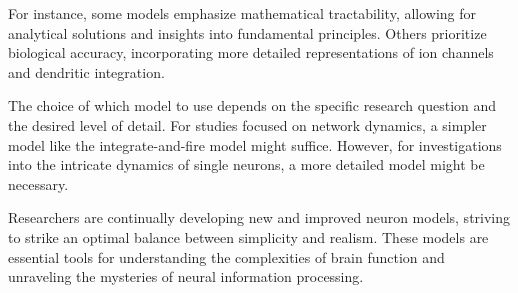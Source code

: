 For instance, some models emphasize mathematical tractability, allowing for analytical solutions and insights into fundamental principles. Others prioritize biological accuracy, incorporating more detailed representations of ion channels and dendritic integration.

The choice of which model to use depends on the specific research question and the desired level of detail. For studies focused on network dynamics, a simpler model like the integrate-and-fire model might suffice. However, for investigations into the intricate dynamics of single neurons, a more detailed model might be necessary.

Researchers are continually developing new and improved neuron models, striving to strike an optimal balance between simplicity and realism. These models are essential tools for understanding the complexities of brain function and unraveling the mysteries of neural information processing.



